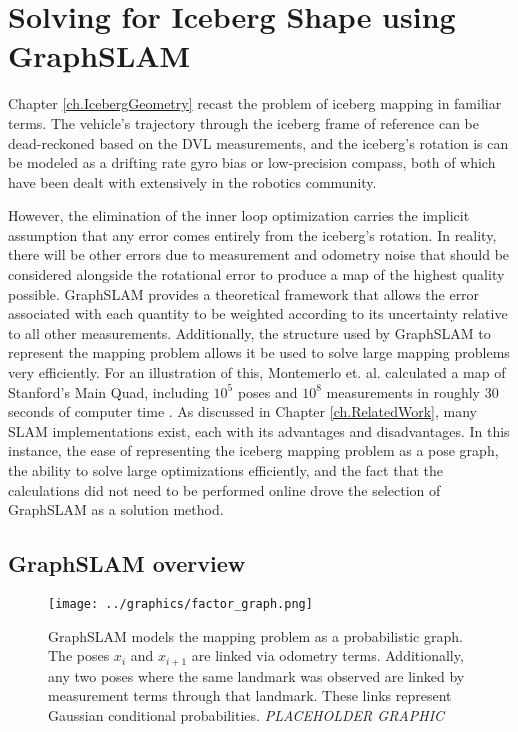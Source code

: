 
\chapter{Solving for Iceberg Shape using GraphSLAM}
\label{ch.GraphSLAM}

Chapter \ref{ch.IcebergGeometry} recast the problem of iceberg mapping in familiar terms. The vehicle's trajectory through the iceberg frame of reference can be dead-reckoned based on the DVL measurements, and the iceberg's rotation is can be modeled as a drifting rate gyro bias or low-precision compass, both of which have been dealt with extensively in the robotics community.

However, the elimination of the inner loop optimization carries the implicit assumption that any error comes entirely from the iceberg's rotation. In reality, there will be other errors due to measurement and odometry noise that should be considered alongside the rotational error to produce a map of the highest quality possible. GraphSLAM provides a theoretical framework that allows the error associated with each quantity to be weighted according to its uncertainty relative to all other measurements. Additionally, the structure used by GraphSLAM to represent the mapping problem allows it be used to solve large mapping problems very efficiently. For an illustration of this, Montemerlo et. al. calculated a map of Stanford's Main Quad, including $10^5$ poses and $10^8$ measurements in roughly 30 seconds of computer time \cite{?}. As discussed in Chapter \ref{ch.RelatedWork}, many SLAM implementations exist, each with its advantages and disadvantages. In this instance, the ease of representing the iceberg mapping problem as a pose graph, the ability to solve large optimizations efficiently, and the fact that the calculations did not need to be performed online drove the selection of GraphSLAM as a solution method.

\section{GraphSLAM overview}

\begin{figure}[htbp]
   \centering
   \texttt{[image: ../graphics/factor\_graph.png]} %
   \caption{GraphSLAM models the mapping problem as a probabilistic graph.  The poses $x_i$ and $x_{i+1}$ are linked via odometry terms. Additionally, any two poses where the same landmark was observed are linked by measurement terms through that landmark. These links represent Gaussian conditional probabilities. \emph{PLACEHOLDER GRAPHIC}}
   \label{fig:GraphSLAM}
\end{figure}



